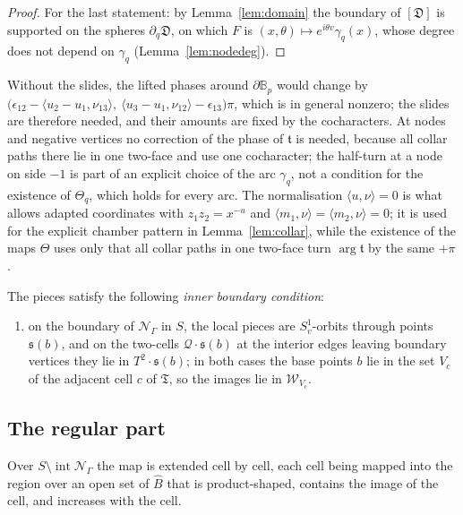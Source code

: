 \begin{proof}
For the last statement: by Lemma~\ref{lem:domain} the boundary of $[\mathfrak D]$ is supported on the spheres
$\partial_q\mathfrak D$, on which $F$ is $(x,\theta)\mapsto e^{i\theta v}\gamma_q(x)$, whose degree does not depend on $\gamma_q$
(Lemma~\ref{lem:nodedeg}).
\end{proof}

Without the slides, the lifted phases around $\partial\mathbb B_p$ would change by
$\bigl(\epsilon_{12}-\langle u_2-u_1,\nu_{13}\rangle,\ \langle u_3-u_1,\nu_{12}\rangle-\epsilon_{13}\bigr)\pi$, which is in general
nonzero; the slides are therefore needed, and their amounts are fixed by the cocharacters. At nodes and negative vertices no
correction of the phase of $\mathfrak t$ is needed, because all collar paths there lie in one two-face and use one cocharacter;
the half-turn at a node on side $-1$ is part of an explicit choice of the arc $\gamma_q$, not a condition for the existence
of $\Theta_q$, which holds for every arc. The
normalisation $\langle u,\nu\rangle=0$ is what allows adapted coordinates with $z_1z_2=x^{-u}$ and
$\langle m_1,\nu\rangle=\langle m_2,\nu\rangle=0$; it is used for the explicit chamber pattern in Lemma~\ref{lem:collar}, while
the existence of the maps $\Theta$ uses only that all collar paths in one two-face turn $\arg\mathfrak t$ by the same $+\pi$.

The pieces satisfy the following \emph{inner boundary condition}:
\begin{enumerate}
\item[(I)] on the boundary of $\mathcal N_\Gamma$ in $S$, the local pieces are $S^1_v$-orbits through points $\mathfrak s(b)$, and on
the two-cells $\mathcal Q\cdot\mathfrak s(b)$ at the interior edges leaving boundary vertices they lie in
$T^2\cdot\mathfrak s(b)$; in both cases the base points $b$ lie in the set $V_c$ of the adjacent cell $c$ of $\mathfrak T$, so the
images lie in $\mathscr W_{V_c}$.
\end{enumerate}

\subsection{The regular part}\label{ssec:res-ext}
Over $S\setminus\operatorname{int}\mathcal N_\Gamma$ the map is extended cell by cell, each cell being mapped into the region
over an open set of $\widehat B$ that is product-shaped, contains the image of the cell, and increases with the cell.

